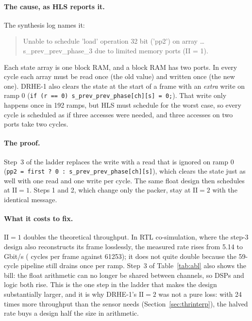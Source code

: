 \paragraph{The cause, as HLS reports it.} The synthesis log names it:
\begin{quote}\small\ttfamily
Unable to schedule 'load' operation 32 bit ('pp2') on array
\dots s\_prev\_prev\_phase\_3 due to limited memory ports (II = 1).
\end{quote}
Each state array is one block RAM, and a block RAM has two ports. In every cycle
each array must be read once (the old value) and written once (the new one).
DRHE-1 also clears the state at the start of a frame with an \emph{extra} write
on ramp 0 (\texttt{if (r == 0) s\_prev\_prev\_phase[ch][s] = 0;}). That write
only happens once in 192 ramps, but HLS must schedule for the worst case, so
every cycle is scheduled as if three accesses were needed, and three accesses on
two ports take two cycles.

\paragraph{The proof.} Step~3 of the ladder replaces the write with a read that
is ignored on ramp 0 (\texttt{pp2 = first ? 0 : s\_prev\_prev\_phase[ch][s]}),
which clears the state just as well with one read and one write per cycle. The
same float design then schedules at $\mathrm{II} = 1$. Steps 1 and 2, which change only the packer, stay at
$\mathrm{II} = 2$ with the identical message.

\paragraph{What it costs to fix.} $\mathrm{II} = 1$ doubles the theoretical
throughput. In RTL co-simulation, where the step-3 design also reconstructs its
frame losslessly, the measured rate rises from \SI{5.14}{} to
\,Gbit/s ( cycles per frame
against \num{61253}); it does not quite double because the 59-cycle pipeline
still drains once per ramp. Step~3 of Table~\ref{tab:abl} also shows the bill: the float arithmetic can no
longer be shared between channels, so DSPs and logic both rise. This is the one step in the ladder that makes the design substantially larger, and it is why DRHE-1's
$\mathrm{II} = 2$ was not a pure loss: with 24 times more throughput than the
sensor needs (Section~\ref{sec:thrinterp}), the halved rate buys a design half
the size in arithmetic.

